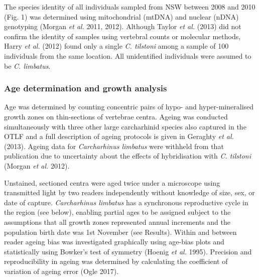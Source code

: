 \documentclass[]{article}
\begin{document}
The species identity of all individuals sampled from NSW between 2008
and 2010 (Fig. 1) was determined using mitochondrial (mtDNA) and nuclear
(nDNA) genotyping (Morgan \emph{et al.} 2011, 2012). Although Taylor
\emph{et al.} (2013) did not confirm the identity of samples using
vertebral counts or molecular methods, Harry \emph{et al.} (2012) found
only a single \emph{C. tilstoni} among a sample of 100 individuals from
the same location. All unidentified individuals were assumed to be
\emph{C. limbatus}.

\subsubsection{Age determination and growth
analysis}\label{age-determination-and-growth-analysis}

Age was determined by counting concentric pairs of hypo- and
hyper-mineralised growth zones on thin-sections of vertebrae centra.
Ageing was conducted simultaneously with three other large carcharhinid
species also captured in the OTLF and a full description of ageing
protocols is given in Geraghty \emph{et al.} (2013). Ageing data for
\emph{Carcharhinus limbatus} were withheld from that publication due to
uncertainty about the effects of hybridisation with \emph{C. tilstoni}
(Morgan \emph{et al.} 2012).

Unstained, sectioned centra were aged twice under a microscope using
transmitted light by two readers independently without knowledge of
size, sex, or date of capture. \emph{Carcharhinus limbatus} has a
synchronous reproductive cycle in the region (see below), enabling
partial ages to be assigned subject to the assumptions that all growth
zones represented annual increments and the population birth date was
1st November (see Results). Within and between reader ageing bias was
investigated graphically using age-bias plots and statistically using
Bowker's test of symmetry (Hoenig \emph{et al.} 1995). Precision and
reproducibility in ageing was determined by calculating the coefficient
of variation of ageing error (Ogle 2017).
\end{document}

